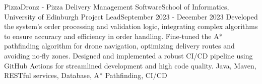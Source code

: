     \resumeSubheading
      {PizzaDronz - Pizza Delivery Management Software}{School of Informatics, University of Edinburgh}
      {Project Lead}{September 2023 - December 2023}
      \resumeItemListStart
          {Developed the system’s order processing and validation logic, integrating complex algorithms to ensure accuracy and efficiency in order handling.}
          {Fine‑tuned the A* pathfinding algorithm for drone navigation, optimizing delivery routes and avoiding no‑fly zones.}
          {Designed and implemented a robust CI/CD pipeline using GitHub Actions for streamlined development and high code quality.}
          {Java, Maven, RESTful services, Database, A* Pathfinding, CI/CD}
      \resumeItemListEnd

  \resumeSubHeadingListEnd